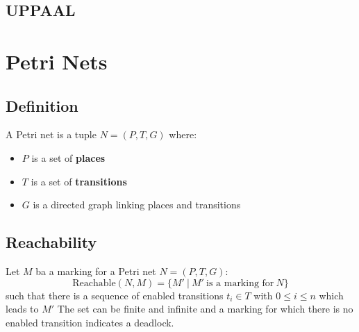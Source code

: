 \documentclass[11pt]{article}
\theoremstyle{definition}
\begin{document}
\subsection{UPPAAL}

\section{Petri Nets}

\subsection{Definition}
A Petri net is a tuple $N = (P, T, G)$ where:
\begin{itemize}
\item $P$ is a set of \textbf{places}
\item $T$ is a set of \textbf{transitions}
\item $G$ is a directed graph linking places and transitions
\end{itemize}

\subsection{Reachability}
Let $M$ ba a marking for a Petri net $N = (P, T, G)$:
\begin{equation}
\text{Reachable}(N,M) = \{M'\ |\ M'\ \text{is a marking for}\ N\}
\end{equation}
such that there is a sequence of enabled transitions $t_{i} \in T$ with $0 \leq i \leq n$ which leads to $M'$
\n
The set can be finite and infinite and a marking for which there is no enabled transition indicates a deadlock. 
\end{document}
